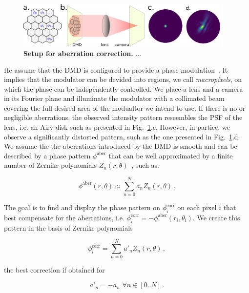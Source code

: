 \documentclass[12pt]{iopart}
\begin{document}
\begin{figure}
  \centering
  \includegraphics[width = 0.95\textwidth]{images/DMD_abberations_setup.pdf}
  \caption{
  \textbf{Setup for aberration correction.}
 ...
  }
  \label{fig:dmd_aberr_setup}
\end{figure}

He assume that the DMD is configured to provide a phase modulation~\cite{Lee1979binary, RODRIGO}. 
It implies that the modulator can be devided into regions, we call {\em macropixels},
on which the phase can be independently controlled.
We place a lens and a camera in its Fourier plane and illuminate the modulator with a collimated beam 
covering the full desired area of the modualtor we intend to use. 
If there is no or negligible aberrations, the observed intensity pattern 
reseembles the PSF of the lens, i.e. an Airy disk such as presented in Fig.~\ref{fig:dmd_aberr_setup}.c.
However, in partice, we observe a significantly distorted pattern,
such as the one presented in Fig.~\ref{fig:dmd_aberr_setup}.d.\\

We assume the the aberrations introduced by the DMD is smooth and 
can be described by a phase pattern $\phi^\text{aber}$ 
that can be well approximated by a finite number of 
Zernike polynomials $Z_n(r,\theta)$~\cite{Zernike1934beugungstheorie}, such as:

\begin{equation}
  \phi^\text{aber}(r,\theta) \approx \sum_{n=0}^N a_n Z_n(r,\theta) \, .
\end{equation}

The goal is to find and display the phase pattern 
on $\phi_i^\text{corr}$ on each pixel $i$ that best compensate for the aberrations, 
i.e. $\phi_i^\text{corr} = -\phi^\text{aber}(r_i,\theta_i)$.
We create this pattern in the basis of Zernike polynomials

\begin{equation}
  \phi_i^\text{corr} = \sum_{n=0}^N a'_n Z_n(r,\theta) \, ,
\end{equation}

the best correction if obtained for 


\begin{equation}
  a'_n = -a_n \,\, \forall n \in [0..N]\, .
\end{equation}
\end{document}
